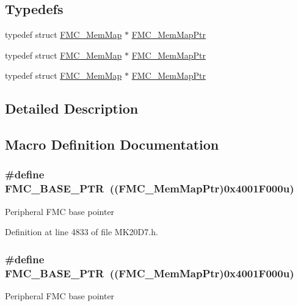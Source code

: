 \subsection*{Typedefs}
\begin{DoxyCompactItemize}
\item 
typedef struct \hyperlink{struct_f_m_c___mem_map}{F\+M\+C\+\_\+\+Mem\+Map} $\ast$ \hyperlink{group___f_m_c___peripheral_ga0552c12b8b29667270d15450ed977a6e}{F\+M\+C\+\_\+\+Mem\+Map\+Ptr}
\item 
typedef struct \hyperlink{struct_f_m_c___mem_map}{F\+M\+C\+\_\+\+Mem\+Map} $\ast$ \hyperlink{group___f_m_c___peripheral_ga0552c12b8b29667270d15450ed977a6e}{F\+M\+C\+\_\+\+Mem\+Map\+Ptr}
\item 
typedef struct \hyperlink{struct_f_m_c___mem_map}{F\+M\+C\+\_\+\+Mem\+Map} $\ast$ \hyperlink{group___f_m_c___peripheral_ga0552c12b8b29667270d15450ed977a6e}{F\+M\+C\+\_\+\+Mem\+Map\+Ptr}
\end{DoxyCompactItemize}


\subsection{Detailed Description}


\subsection{Macro Definition Documentation}
\subsubsection[{\texorpdfstring{F\+M\+C\+\_\+\+B\+A\+S\+E\+\_\+\+P\+TR}{FMC_BASE_PTR}}]{\setlength{\rightskip}{0pt plus 5cm}\#define F\+M\+C\+\_\+\+B\+A\+S\+E\+\_\+\+P\+TR~(({\bf F\+M\+C\+\_\+\+Mem\+Map\+Ptr})0x4001\+F000u)}\hypertarget{group___f_m_c___peripheral_ga0a740437b573e32e6b932bf729485fd9}{}\label{group___f_m_c___peripheral_ga0a740437b573e32e6b932bf729485fd9}
Peripheral F\+MC base pointer 

Definition at line 4833 of file M\+K20\+D7.\+h.

\subsubsection[{\texorpdfstring{F\+M\+C\+\_\+\+B\+A\+S\+E\+\_\+\+P\+TR}{FMC_BASE_PTR}}]{\setlength{\rightskip}{0pt plus 5cm}\#define F\+M\+C\+\_\+\+B\+A\+S\+E\+\_\+\+P\+TR~(({\bf F\+M\+C\+\_\+\+Mem\+Map\+Ptr})0x4001\+F000u)}\hypertarget{group___f_m_c___peripheral_ga0a740437b573e32e6b932bf729485fd9}{}\label{group___f_m_c___peripheral_ga0a740437b573e32e6b932bf729485fd9}
Peripheral F\+MC base pointer 

